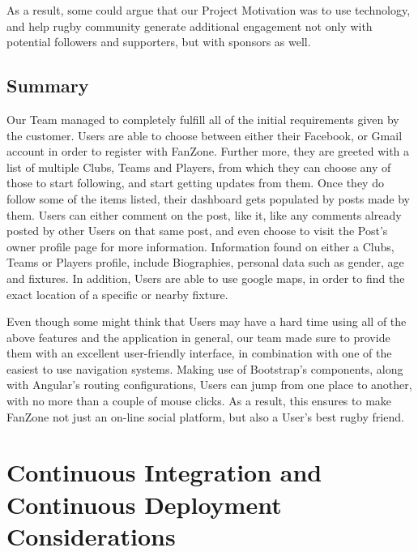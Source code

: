 \documentclass{l3proj}
\begin{document}
As a result, some could argue that our Project Motivation was to use technology, and help
rugby community generate additional engagement not only with potential followers and
supporters, but with sponsors as well.

\subsection{Summary}
Our Team managed to completely fulfill all of the initial requirements given by the customer.
Users are able to choose between either their Facebook, or Gmail account in order
to register with FanZone. Further more, they are greeted with a list of multiple Clubs,
Teams and Players, from which they can choose any of those to start following, and start
getting updates from them. Once they do follow some of the items listed, their dashboard
gets populated by posts made by them. Users can either comment on the post, like it, like
any comments already posted by other Users on that same post, and even choose to visit
the Post's owner profile page for more information. Information found on either a Clubs, Teams
or Players profile, include Biographies, personal data such as gender, age and fixtures.
In addition, Users are able to use google maps, in order to find the exact location of
a specific or nearby fixture.

Even though some might think that Users may have a hard time using all of the above
features and the application in general, our team made sure to provide them with an
excellent user-friendly interface, in combination with one of the easiest to use
navigation systems. Making use of Bootstrap's components, along with Angular's routing
configurations, Users can jump from one place to another, with no more than a couple
of mouse clicks. As a result, this ensures to make FanZone not just an on-line
social platform, but also a User's best rugby friend.
%
\newpage
\section{Continuous Integration and Continuous Deployment Considerations}
\label{sec:cicd}
\end{document}
